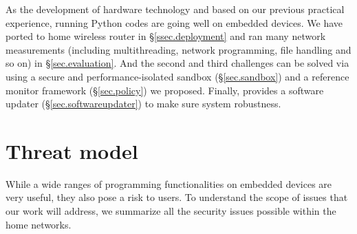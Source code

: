 As the development of hardware technology and based on our previous practical experience, running Python codes are going well on embedded devices. We have ported \sysname to home wireless router in \S{\ref{ssec.deployment}} and ran many network measurements (including multithreading, network programming, file handling and so on) in \S{\ref{sec.evaluation}}. And the second and third challenges can be solved via using a secure and performance-isolated sandbox (\S{\ref{sec.sandbox}}) and a reference monitor framework  (\S{\ref{sec.policy}}) we proposed. Finally, \sysname provides a software updater (\S{\ref{sec.softwareupdater}}) to make sure system robustness.

\section{Threat model}
\label{ssec.threat_models}
While a wide ranges of programming functionalities on embedded devices are very useful, they also pose a risk to users. To understand the scope of issues that our work will address, we summarize all the security issues possible within the home networks.

